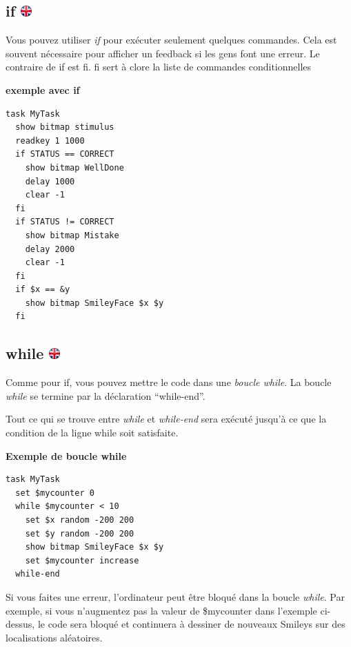\documentclass[
]{book}
\begin{document}
\hypertarget{if}{%
\subsection[if ]{\texorpdfstring{if \href{https://www.psytoolkit.org/doc3.2.0/syntax.html\#task-if}{\protect\includegraphics{img/ukflag.png}}}{if }}\label{if}}

Vous pouvez utiliser \emph{if} pour exécuter seulement quelques commandes. Cela est souvent nécessaire pour afficher un feedback si les gens font une erreur. Le contraire de if est fi. fi sert à clore la liste de commandes conditionnelles

\textbf{exemple avec if}

\begin{verbatim}
task MyTask
  show bitmap stimulus
  readkey 1 1000
  if STATUS == CORRECT
    show bitmap WellDone
    delay 1000
    clear -1
  fi
  if STATUS != CORRECT
    show bitmap Mistake
    delay 2000
    clear -1
  fi
  if $x == &y
    show bitmap SmileyFace $x $y
  fi
\end{verbatim}

\hypertarget{while}{%
\subsection[while ]{\texorpdfstring{while \href{https://www.psytoolkit.org/doc3.2.0/syntax.html\#task-while}{\protect\includegraphics{img/ukflag.png}}}{while }}\label{while}}

Comme pour if, vous pouvez mettre le code dans une \emph{boucle while}. La boucle \emph{while} se termine par la déclaration ``while-end''.

Tout ce qui se trouve entre \emph{while} et \emph{while-end} sera exécuté jusqu'à ce que la condition de la ligne while soit satisfaite.

\textbf{Exemple de boucle while}

\begin{verbatim}
task MyTask
  set $mycounter 0
  while $mycounter < 10
    set $x random -200 200
    set $y random -200 200
    show bitmap SmileyFace $x $y
    set $mycounter increase
  while-end
\end{verbatim}

Si vous faites une erreur, l'ordinateur peut être bloqué dans la boucle \emph{while}. Par exemple, si vous n'augmentez pas la valeur de \$mycounter dans l'exemple ci-dessus, le code sera bloqué et continuera à dessiner de nouveaux Smileys sur des localisations aléatoires.
\end{document}
